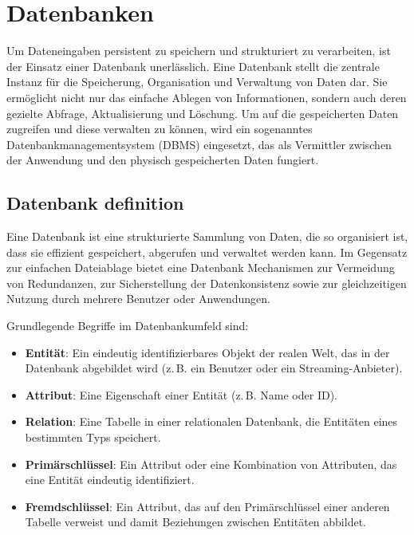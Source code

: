 \section{Datenbanken}
Um Dateneingaben persistent zu speichern und strukturiert zu verarbeiten, ist der
Einsatz einer Datenbank unerlässlich. Eine Datenbank stellt die zentrale Instanz
für die Speicherung, Organisation und Verwaltung von Daten dar. Sie ermöglicht
nicht nur das einfache Ablegen von Informationen, sondern auch deren gezielte
Abfrage, Aktualisierung und Löschung. Um auf die gespeicherten Daten zugreifen
und diese verwalten zu können, wird ein sogenanntes Datenbankmanagementsystem
(DBMS) eingesetzt, das als Vermittler zwischen der Anwendung und den physisch
gespeicherten Daten fungiert.

\subsection{Datenbank definition}
Eine Datenbank ist eine strukturierte Sammlung von Daten, die so organisiert ist,
dass sie effizient gespeichert, abgerufen und verwaltet werden kann. Im
Gegensatz zur einfachen Dateiablage bietet eine Datenbank Mechanismen zur
Vermeidung von Redundanzen, zur Sicherstellung der Datenkonsistenz sowie zur
gleichzeitigen Nutzung durch mehrere Benutzer oder Anwendungen.

Grundlegende Begriffe im Datenbankumfeld sind:

\begin{itemize}
    \item \textbf{Entität}: Ein eindeutig identifizierbares Objekt der realen Welt,
    das in der Datenbank abgebildet wird (z.\,B. ein Benutzer oder ein
    Streaming-Anbieter).
    \item \textbf{Attribut}: Eine Eigenschaft einer Entität (z.\,B. Name oder ID).
    \item \textbf{Relation}: Eine Tabelle in einer relationalen Datenbank, die
    Entitäten eines bestimmten Typs speichert.
    \item \textbf{Primärschlüssel}: Ein Attribut oder eine Kombination von
    Attributen, das eine Entität eindeutig identifiziert.
    \item \textbf{Fremdschlüssel}: Ein Attribut, das auf den Primärschlüssel einer
    anderen Tabelle verweist und damit Beziehungen zwischen Entitäten abbildet.
\end{itemize}



